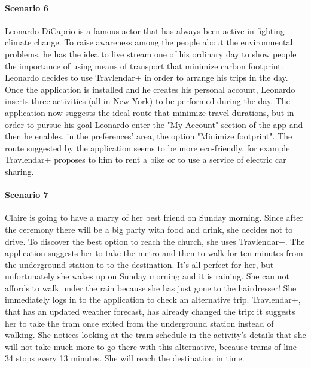 \documentclass[12pt,titlepage]{article}
\begin{document}
\paragraph{Scenario 6}
Leonardo DiCaprio is a famous actor that has always been active in fighting climate change. To raise awareness among the people about the environmental problems, he has the idea to live stream one of his ordinary day to show people the importance of using means of transport that minimize carbon footprint. 
Leonardo decides to use Travlendar+ in order to arrange his trips in the day. Once the application is installed and he creates his personal account, Leonardo inserts three activities (all in New York) to be performed during the day. The application now suggests the ideal route that minimize travel durations, but in order to pursue his goal Leonardo enter the "My Account" section of the app and then he enables, in the preferences' area, the option "Minimize footprint". The route suggested by the application seems to be more eco-friendly, for example Travlendar+ proposes to him to rent a bike or to use a service of electric car sharing.

\paragraph{Scenario 7}
Claire is going to have a marry of her best friend on Sunday morning. Since after the ceremony there will be a big party with food and drink, she decides not to drive. To discover the best option to reach the church, she uses Travlendar+. The application suggests her to take the metro and then to walk for ten minutes from the underground station to to the destination. It's all perfect for her, but unfortunately she wakes up on Sunday morning and it is raining. She can not affords to walk under the rain because she has just gone to the hairdresser! She immediately logs in to the application to check an alternative trip. Travlendar+, that has an updated weather forecast, has already changed the trip: it suggests her to take the tram once exited from the underground station instead of walking. She notices looking at the tram schedule in the activity's details that she will not take much more to go there with this alternative, because trams of line 34 stops every 13 minutes. She will reach the destination in time.
\end{document}
